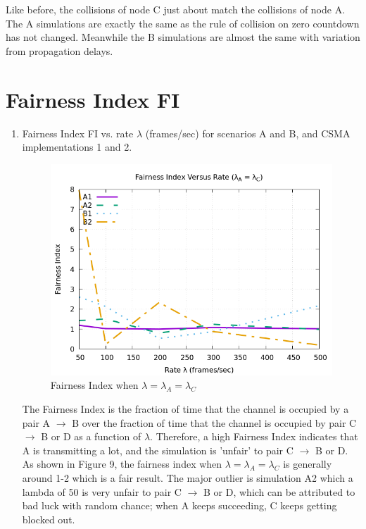 \documentclass[12pt]{article}
\begin{document}
\begin{enumerate}
{            Like before, the collisions of node C just about match the collisions of node A. The A simulations are exactly the same as the rule of collision on zero countdown has not changed. Meanwhile the B simulations are almost the same with variation from propagation delays.
        }        
    
    
    \end{enumerate}
    
    
\clearpage
    \section{Fairness Index FI}

    \begin{enumerate}
    
        \item {
            Fairness Index FI vs. rate \(\lambda{}\) (frames/sec) for scenarios A and B, and CSMA implementations 1 and 2.
            
            \begin{figure}[!htb]
                \centering
                \includegraphics[width=5in]{3A.png}
                \caption{Fairness Index when \(\lambda{} = \lambda{}_A = \lambda{}_C\) }
                \label{fig:3A}
            \end{figure}

            The Fairness Index is the fraction of time that the channel is occupied by a pair A \(\rightarrow\) B over the fraction of time that the channel is occupied by pair C \(\rightarrow\) B or D as a function of \(\lambda\). Therefore, a high Fairness Index indicates that A is transmitting a lot, and the simulation is 'unfair' to pair C \(\rightarrow\) B or D. As shown in Figure 9, the fairness index when \(\lambda{} = \lambda{}_A = \lambda{}_C\) is generally around 1-2 which is a fair result. The major outlier is simulation A2 which a lambda of 50 is very unfair to pair C \(\rightarrow\) B or D, which can be attributed to bad luck with random chance; when A keeps succeeding, C keeps getting blocked out.
        }    
    

\end{enumerate}
\end{document}
